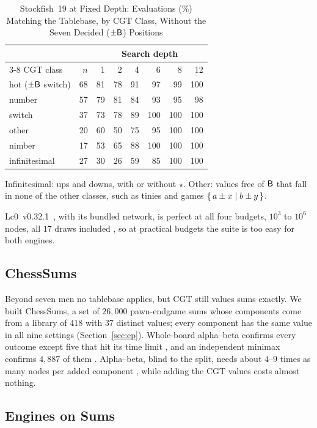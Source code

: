 \begin{table}[!t]
\centering
\caption{Stockfish~19 at Fixed Depth: Evaluations (\%) Matching the Tablebase, by CGT Class, Without the
Seven Decided ($\pm\mathsf{B}$) Positions}
\label{tab:sf}
\footnotesize
\begin{tabular}{@{}lrrrrrrr@{}}
\toprule
 & & \multicolumn{6}{c}{Search depth} \\
\cmidrule(l){3-8}
CGT class & $n$ & 1 & 2 & 4 & 6 & 8 & 12 \\
\midrule
hot ($\pm\mathsf{B}$ switch) & 68 & 81 & 78 & 91 & 97 & 99 & 100 \\
number & 57 & 79 & 81 & 84 & 93 & 95 & 98 \\
switch & 37 & 73 & 78 & 89 & 100 & 100 & 100 \\
other & 20 & 60 & 50 & 75 & 95 & 100 & 100 \\
nimber & 17 & 53 & 65 & 88 & 100 & 100 & 100 \\
infinitesimal & 27 & 30 & 26 & 59 & 85 & 100 & 100 \\
\bottomrule
\end{tabular}

\smallskip
\parbox{\columnwidth}{\footnotesize Infinitesimal: ups and downs, with or without $\star$. Other: values free of
$\mathsf{B}$ that fall in none of the other classes, such as tinies and games $\{\,a\pm x \mid b\pm y\,\}$.}
\end{table}

Lc0~v0.32.1~\cite{Lc0}, with its bundled network, is perfect at all four budgets, $10^3$ to $10^6$ nodes,
all $17$ draws included , so at practical budgets the suite is too easy for both engines.

\subsection{ChessSums}

Beyond seven men no tablebase applies, but CGT still values sums exactly. We built ChessSums, a set of
$26{,}000$ pawn-endgame sums whose components come from a library of $418$ with $37$ distinct values; every
component has the same value in all nine settings (Section~\ref{sec:ep}). Whole-board alpha--beta confirms every outcome
except five that hit its time limit , and an independent minimax confirms $4{,}887$ of them
. Alpha--beta, blind to the split,
needs about $4$--$9$ times as many nodes per added component , while adding the CGT values costs
almost nothing.

\subsection{Engines on Sums}

